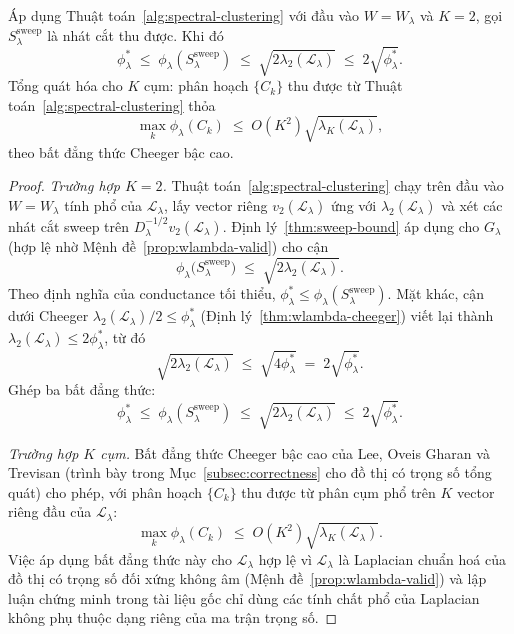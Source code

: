 \begin{theorem}
\label{thm:wlambda-spectral-correctness}
Áp dụng Thuật toán~\ref{alg:spectral-clustering} với đầu vào $W = W_\lambda$ và $K = 2$, gọi $S^{\mathrm{sweep}}_\lambda$ là nhát cắt thu được. Khi đó
\[
    \phi_\lambda^* \;\leq\; \phi_\lambda(S^{\mathrm{sweep}}_\lambda) \;\leq\; \sqrt{2 \lambda_2(\mathcal{L}_\lambda)} \;\leq\; 2 \sqrt{\phi_\lambda^*}.
\]
Tổng quát hóa cho $K$ cụm: phân hoạch $\{C_k\}$ thu được từ Thuật toán~\ref{alg:spectral-clustering} thỏa
\[
    \max_k \phi_\lambda(C_k) \;\leq\; O(K^2) \sqrt{\lambda_K(\mathcal{L}_\lambda)},
\]
theo bất đẳng thức Cheeger bậc cao.
\end{theorem}

\begin{proof}
\emph{Trường hợp $K = 2$.} Thuật toán~\ref{alg:spectral-clustering} chạy trên đầu vào $W = W_\lambda$ tính phổ của $\mathcal{L}_\lambda$, lấy vector riêng $v_2(\mathcal{L}_\lambda)$ ứng với $\lambda_2(\mathcal{L}_\lambda)$ và xét các nhát cắt sweep trên $D_\lambda^{-1/2} v_2(\mathcal{L}_\lambda)$. Định lý~\ref{thm:sweep-bound} áp dụng cho $G_\lambda$ (hợp lệ nhờ Mệnh đề~\ref{prop:wlambda-valid}) cho cận
\[
    \phi_\lambda\bigl(S^{\mathrm{sweep}}_\lambda\bigr) \;\leq\; \sqrt{2 \lambda_2(\mathcal{L}_\lambda)}.
\]
Theo định nghĩa của conductance tối thiểu, $\phi_\lambda^* \leq \phi_\lambda(S^{\mathrm{sweep}}_\lambda)$. Mặt khác, cận dưới Cheeger $\lambda_2(\mathcal{L}_\lambda) / 2 \leq \phi_\lambda^*$ (Định lý~\ref{thm:wlambda-cheeger}) viết lại thành $\lambda_2(\mathcal{L}_\lambda) \leq 2 \phi_\lambda^*$, từ đó
\[
    \sqrt{2 \lambda_2(\mathcal{L}_\lambda)} \;\leq\; \sqrt{4 \phi_\lambda^*} \;=\; 2 \sqrt{\phi_\lambda^*}.
\]
Ghép ba bất đẳng thức:
\[
    \phi_\lambda^* \;\leq\; \phi_\lambda(S^{\mathrm{sweep}}_\lambda) \;\leq\; \sqrt{2 \lambda_2(\mathcal{L}_\lambda)} \;\leq\; 2 \sqrt{\phi_\lambda^*}.
\]

\emph{Trường hợp $K$ cụm.} Bất đẳng thức Cheeger bậc cao của Lee, Oveis Gharan và Trevisan (trình bày trong Mục~\ref{subsec:correctness} cho đồ thị có trọng số tổng quát) cho phép, với phân hoạch $\{C_k\}$ thu được từ phân cụm phổ trên $K$ vector riêng đầu của $\mathcal{L}_\lambda$:
\[
    \max_k \phi_\lambda(C_k) \;\leq\; O(K^2) \sqrt{\lambda_K(\mathcal{L}_\lambda)}.
\]
Việc áp dụng bất đẳng thức này cho $\mathcal{L}_\lambda$ hợp lệ vì $\mathcal{L}_\lambda$ là Laplacian chuẩn hoá của đồ thị có trọng số đối xứng không âm (Mệnh đề~\ref{prop:wlambda-valid}) và lập luận chứng minh trong tài liệu gốc chỉ dùng các tính chất phổ của Laplacian không phụ thuộc dạng riêng của ma trận trọng số.
\end{proof}

